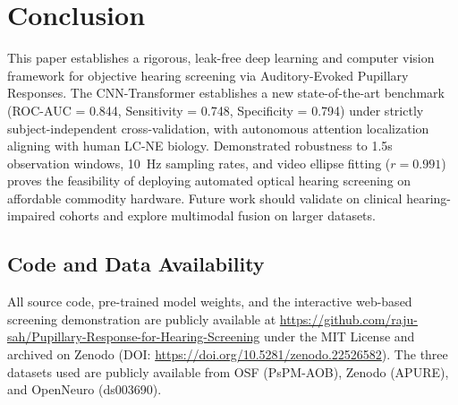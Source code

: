 \documentclass[journal]{IEEEtran}
\begin{document}
\section{Conclusion}
This paper establishes a rigorous, leak-free deep learning and computer vision framework for objective hearing screening via Auditory-Evoked Pupillary Responses. The CNN-Transformer establishes a new state-of-the-art benchmark (ROC-AUC = 0.844, Sensitivity = 0.748, Specificity = 0.794) under strictly subject-independent cross-validation, with autonomous attention localization aligning with human LC-NE biology. Demonstrated robustness to 1.5s observation windows, 10~Hz sampling rates, and video ellipse fitting ($r = 0.991$) proves the feasibility of deploying automated optical hearing screening on affordable commodity hardware. Future work should validate on clinical hearing-impaired cohorts and explore multimodal fusion on larger datasets.

\subsection*{Code and Data Availability}
All source code, pre-trained model weights, and the interactive web-based screening demonstration are publicly available at \url{https://github.com/raju-sah/Pupillary-Response-for-Hearing-Screening} under the MIT License and archived on Zenodo (DOI: \url{https://doi.org/10.5281/zenodo.22526582}). The three datasets used are publicly available from OSF (PsPM-AOB), Zenodo (APURE), and OpenNeuro (ds003690).



\end{document}
